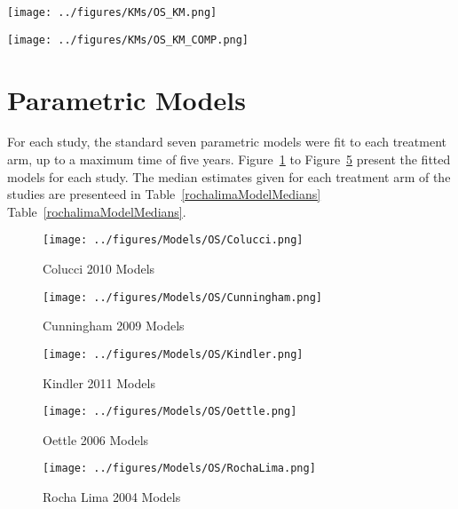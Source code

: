 \begin{sidewaysfigure}[ht]
    \centering
    \texttt{[image: ../figures/KMs/OS\_KM.png]}
    \caption{OS Kaplan-Meier data for Gemcitabine}
    \label{fig:OSGem}
\end{sidewaysfigure}

\begin{sidewaysfigure}[ht]
    \centering
    \texttt{[image: ../figures/KMs/OS\_KM\_COMP.png]}
    \caption{OS Kaplan-Meier data for comparators}
    \label{fig:OSComp}
\end{sidewaysfigure}

\section{Parametric Models}

For each study, the standard seven parametric models were fit to each treatment arm, up to a maximum time of five years. Figure~\ref{collucimodels} to Figure~\ref{rlmodels} present the fitted models for each study. The median estimates given for each treatment arm of the studies are presenteed in Table~\ref{rochalimaModelMedians} \- Table~\ref{rochalimaModelMedians}.

\begin{figure}
    \texttt{[image: ../figures/Models/OS/Colucci.png]}
    \caption{Colucci 2010 Models}
    \label{collucimodels}
\end{figure}

\begin{figure}
    \texttt{[image: ../figures/Models/OS/Cunningham.png]}
    \caption{Cunningham 2009 Models}
    \label{cunnmodels}
\end{figure}

\begin{figure}
    \texttt{[image: ../figures/Models/OS/Kindler.png]}
    \caption{Kindler 2011 Models}
    \label{kinmodels}
\end{figure}

\begin{figure}
    \texttt{[image: ../figures/Models/OS/Oettle.png]}
    \caption{Oettle 2006 Models}
    \label{oettlemodels}
\end{figure}

\begin{figure}
    \texttt{[image: ../figures/Models/OS/RochaLima.png]}
    \caption{Rocha Lima 2004 Models}
    \label{rlmodels}
\end{figure}